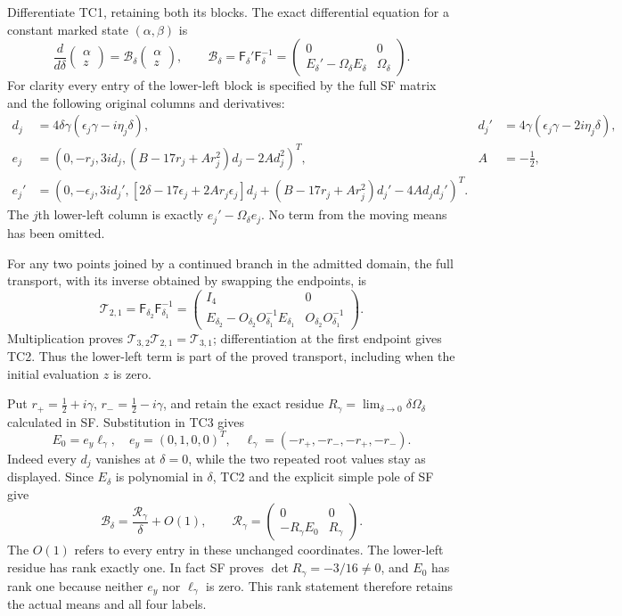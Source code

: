 Differentiate TC1, retaining both its blocks. The exact differential
equation for a constant marked state $(\alpha,\beta)$ is
\[
 \frac{d}{d\delta}\begin{pmatrix}\alpha\\z\end{pmatrix}
 =\mathcal B_\delta\begin{pmatrix}\alpha\\z\end{pmatrix},\qquad
 \mathcal B_\delta=\mathsf F_\delta'\mathsf F_\delta^{-1}
 =\begin{pmatrix}0&0\\
 E_\delta'-\Omega_\delta E_\delta&\Omega_\delta\end{pmatrix}.
 \tag{TC2}
\]
For clarity every entry of the lower-left block is specified by the
full SF matrix and the following original columns and derivatives:
\[
 \begin{aligned}
 d_j&=4\delta\gamma(\epsilon_j\gamma-i\eta_j\delta),&
 d_j'&=4\gamma(\epsilon_j\gamma-2i\eta_j\delta),\\
 e_j&=(0,-r_j,3id_j,
       (B-17r_j+Ar_j^2)d_j-2Ad_j^2)^T,& A&=-\tfrac12,\\
 e_j'&=(0,-\epsilon_j,3id_j',
 [2\delta-17\epsilon_j+2Ar_j\epsilon_j]d_j
 +(B-17r_j+Ar_j^2)d_j'-4Ad_jd_j')^T.
 \end{aligned} \tag{TC3}
\]
The $j$th lower-left column is exactly $e_j'-\Omega_\delta e_j$.
No term from the moving means has been omitted.

For any two points joined by a continued branch in the admitted
domain, the full transport, with its inverse obtained by swapping
the endpoints, is
\[
 \mathcal T_{2,1}=\mathsf F_{\delta_2}\mathsf F_{\delta_1}^{-1}
 =\begin{pmatrix}I_4&0\\
 E_{\delta_2}-O_{\delta_2}O_{\delta_1}^{-1}E_{\delta_1}&
 O_{\delta_2}O_{\delta_1}^{-1}\end{pmatrix}.
 \tag{TC4}
\]
Multiplication proves $\mathcal T_{3,2}\mathcal T_{2,1}
=\mathcal T_{3,1}$; differentiation at the first endpoint gives TC2.
Thus the lower-left term is part of the proved transport, including
when the initial evaluation $z$ is zero.

Put $r_+=\tfrac12+i\gamma$, $r_-=\tfrac12-i\gamma$, and retain
the exact residue $R_\gamma=\lim_{\delta\to0}\delta\Omega_\delta$
calculated in SF. Substitution in TC3 gives
\[
 E_0=e_y\ell_\gamma,\quad e_y=(0,1,0,0)^T,\quad
 \ell_\gamma=(-r_+,-r_-,-r_+,-r_-).
 \tag{TC5}
\]
Indeed every $d_j$ vanishes at $\delta=0$, while the two repeated
root values stay as displayed. Since $E_\delta$ is polynomial in
$\delta$, TC2 and the explicit simple pole of SF give
\[
 \mathcal B_\delta=\frac{\mathcal R_\gamma}{\delta}+O(1),\qquad
 \mathcal R_\gamma=
 \begin{pmatrix}0&0\\-R_\gamma E_0&R_\gamma\end{pmatrix}.
 \tag{TC6}
\]
The $O(1)$ refers to every entry in these unchanged coordinates.
The lower-left residue has rank exactly one. In fact SF proves
$\det R_\gamma=-3/16\ne0$, and $E_0$ has rank one because neither
$e_y$ nor $\ell_\gamma$ is zero. This rank statement therefore
retains the actual means and all four labels.


